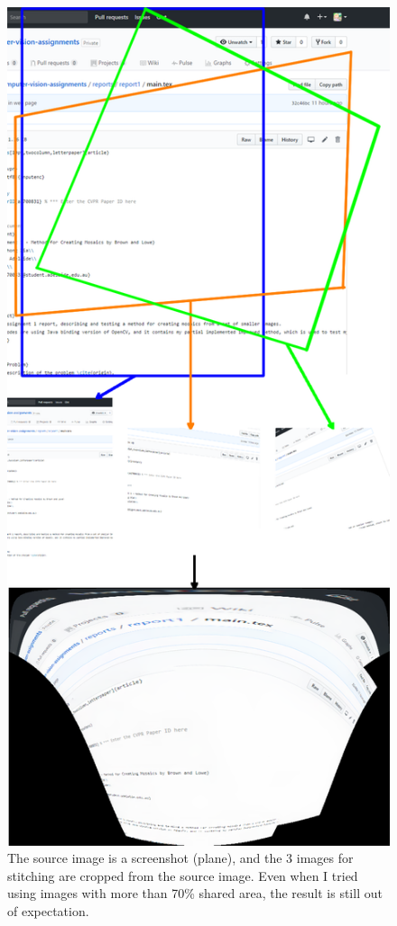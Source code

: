 \documentclass[10pt,twocolumn,letterpaper]{article}
\begin{document}

\begin{figure}[t]
    \begin{center}
        \includegraphics[width=0.9\linewidth]{fail}
    \end{center}
    \caption{The source image is a screenshot (plane), and the 3 images for stitching are cropped from the source image.
    Even when I tried using images with more than 70\% shared area, the result is still out of expectation.}
    \label{fig:fail}
\end{figure}
\end{document}
